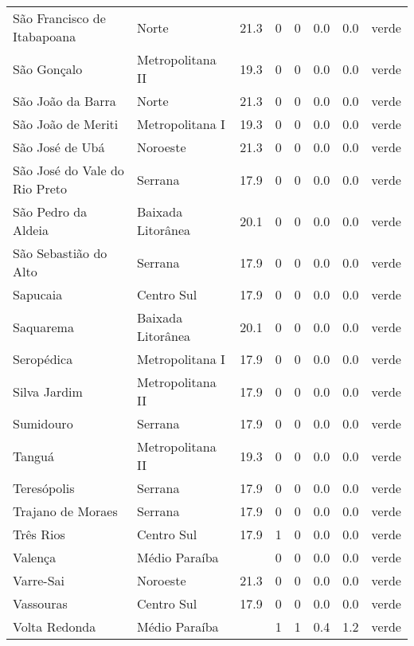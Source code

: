 \begin{longtable}{l|lllllll}
  São Francisco de Itabapoana & Norte & 21.3 & 0 & 0 & 0.0 & 0.0 & verde \\ 
  São Gonçalo & Metropolitana II & 19.3 & 0 & 0 & 0.0 & 0.0 & verde \\ 
  São João da Barra & Norte & 21.3 & 0 & 0 & 0.0 & 0.0 & verde \\ 
  São João de Meriti & Metropolitana I & 19.3 & 0 & 0 & 0.0 & 0.0 & verde \\ 
  São José de Ubá & Noroeste & 21.3 & 0 & 0 & 0.0 & 0.0 & verde \\ 
  São José do Vale do Rio Preto & Serrana & 17.9 & 0 & 0 & 0.0 & 0.0 & verde \\ 
  São Pedro da Aldeia & Baixada Litorânea & 20.1 & 0 & 0 & 0.0 & 0.0 & verde \\ 
  São Sebastião do Alto & Serrana & 17.9 & 0 & 0 & 0.0 & 0.0 & verde \\ 
  Sapucaia & Centro Sul & 17.9 & 0 & 0 & 0.0 & 0.0 & verde \\ 
  Saquarema & Baixada Litorânea & 20.1 & 0 & 0 & 0.0 & 0.0 & verde \\ 
  Seropédica & Metropolitana I & 17.9 & 0 & 0 & 0.0 & 0.0 & verde \\ 
  Silva Jardim & Metropolitana II & 17.9 & 0 & 0 & 0.0 & 0.0 & verde \\ 
  Sumidouro & Serrana & 17.9 & 0 & 0 & 0.0 & 0.0 & verde \\ 
  Tanguá & Metropolitana II & 19.3 & 0 & 0 & 0.0 & 0.0 & verde \\ 
  Teresópolis & Serrana & 17.9 & 0 & 0 & 0.0 & 0.0 & verde \\ 
  Trajano de Moraes & Serrana & 17.9 & 0 & 0 & 0.0 & 0.0 & verde \\ 
  Três Rios & Centro Sul & 17.9 & 1 & 0 & 0.0 & 0.0 & verde \\ 
  Valença & Médio Paraíba &  & 0 & 0 & 0.0 & 0.0 & verde \\ 
  Varre-Sai & Noroeste & 21.3 & 0 & 0 & 0.0 & 0.0 & verde \\ 
  Vassouras & Centro Sul & 17.9 & 0 & 0 & 0.0 & 0.0 & verde \\ 
  Volta Redonda & Médio Paraíba &  & 1 & 1 & 0.4 & 1.2 & verde \\ 
  \hline
\end{longtable}
